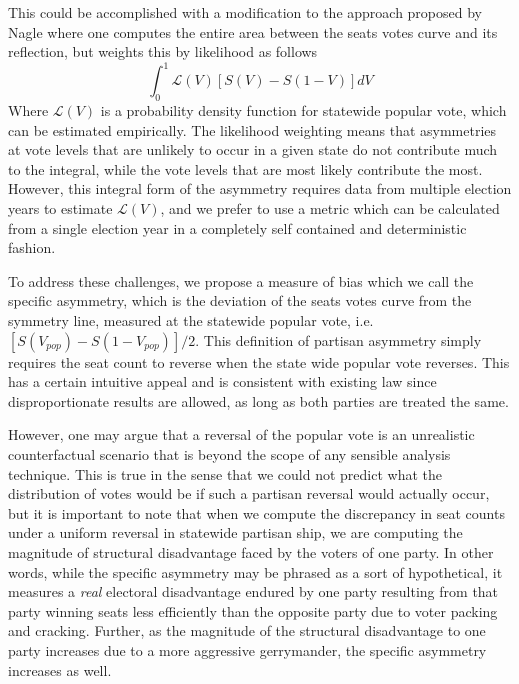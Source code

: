 \documentclass[preprint,12pt]{article}
\begin{document}
This could be accomplished with a modification to the approach proposed by Nagle where one computes the entire area between the seats votes curve and its reflection, but weights this by likelihood as follows
\begin{equation}
    \int_{0}^{1}\mathcal{L}(V)\left[S(V)-S(1-V)\right]dV\label{eq:intAsym}
\end{equation}
Where $\mathcal{L}(V)$ is a probability density function for statewide popular vote, which can be estimated empirically.
The likelihood weighting means that asymmetries at vote levels that are unlikely to occur in a given state do not contribute much to the integral, while the vote levels that are most likely contribute the most.
However, this integral form of the asymmetry requires data from multiple election years to estimate $\mathcal{L}(V)$, and we prefer to use a metric which can be calculated from a single election year in a completely self contained and deterministic fashion.


To address these challenges, we propose a measure of bias which we call the specific asymmetry, which is the deviation of the seats votes curve from the symmetry line, measured at the statewide popular vote, i.e. $\left[S(V_{pop})-S(1-V_{pop})\right]/2$.
This definition of partisan asymmetry simply requires the seat count to reverse when the state wide popular vote reverses.
This has a certain intuitive appeal and is consistent with existing law since disproportionate results are allowed, as long as both parties are treated the same.

However, one may argue that a reversal of the popular vote is an unrealistic counterfactual scenario that is beyond the scope of any sensible analysis technique.
This is true in the sense that we could not predict what the distribution of votes would be if such a partisan reversal would actually occur, but it is important to note that when we compute the discrepancy in seat counts under a uniform reversal in statewide partisan ship, we are computing the magnitude of structural disadvantage faced by the voters of one party.
In other words, while the specific asymmetry may be phrased as a sort of hypothetical, it measures a \emph{real} electoral disadvantage endured by one party resulting from that party winning seats less efficiently than the opposite party due to voter packing and cracking.
Further, as the magnitude of the structural disadvantage to one party increases due to a more aggressive gerrymander, the specific asymmetry increases as well.
\end{document}
